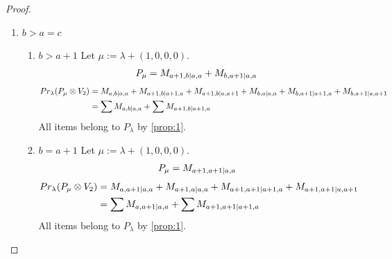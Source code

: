 \documentclass[12pt,a4paper]{article}
\begin{document}
\begin{proof}
\begin{enumerate}
\begin{enumerate}
\item $b=a+1$
        Let $\mu:=\lambda + (1,0,0,0) $. 
\begin{equation}\notag
  \begin{aligned}
      P_{\mu} =M_{a+1,a+1|c,a}
  \end{aligned}
\end{equation}
\begin{equation}\notag
  \begin{aligned}
  Pr_{\lambda}(P_\mu \otimes V_2) &=
M_{a,a+1|c,a}
+M_{a+1,a|c,a}
+M_{a+1,a+1|c,a+1}
                                  &=
\sum M_{a,a+1|c,a}
+ M_{a+1,a+1|c,a+1}
  \end{aligned}
\end{equation}
All items belong to $P_\lambda$ by \cref{prop:1}.
  \end{enumerate}
  
\item $b>a=c$
  \begin{enumerate}
    \item $b>a+1$
        Let $\mu:=\lambda + (1,0,0,0) $. 
\begin{equation}\notag
  \begin{aligned}
      P_{\mu} =M_{a+1,b|a,a}
+M_{b,a+1|a,a}
  \end{aligned}
\end{equation}
\begin{equation}\notag
  \begin{aligned}
  Pr_{\lambda}(P_\mu \otimes V_2) &=
M_{a,b|a,a}
+M_{a+1,b|a+1,a}
+M_{a+1,b|a,a+1}
+M_{b,a|a,a}
+M_{b,a+1|a+1,a}
+M_{b,a+1|a,a+1} \\
                                  &=
\sum M_{a,b|a,a}
+\sum M_{a+1,b|a+1,a}
  \end{aligned}
\end{equation}
All items belong to $P_\lambda$ by \cref{prop:1}.
    
\item $b=a+1$
        Let $\mu:=\lambda + (1,0,0,0) $. 
\begin{equation}\notag
  \begin{aligned}
      P_{\mu} =M_{a+1,a+1|a,a}
  \end{aligned}
\end{equation}
\begin{equation}\notag
  \begin{aligned}
  Pr_{\lambda}(P_\mu \otimes V_2) &=
M_{a,a+1|a,a}
+M_{a+1,a|a,a}
+M_{a+1,a+1|a+1,a}
+M_{a+1,a+1|a,a+1} \\
                                  &=
\sum M_{a,a+1|a,a}
+\sum M_{a+1,a+1|a+1,a}
  \end{aligned}
\end{equation}
All items belong to $P_\lambda$ by \cref{prop:1}.
  \end{enumerate}
  

\end{enumerate}
\end{proof}
\end{document}
